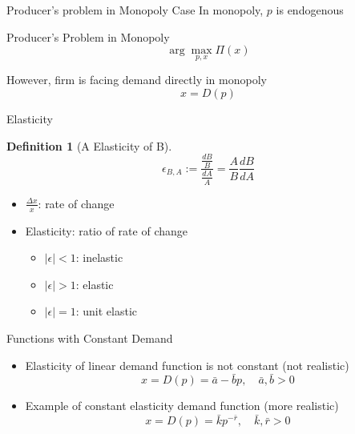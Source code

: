 \documentclass[final]{beamer}
\newtheorem{defn}{Definition}
\begin{document}
\begin{frame}[t]{Producer's problem in Monopoly Case}
	In monopoly, $p$ is endogenous
	\begin{block}
		{Producer's Problem in Monopoly}
		\[
			\arg\max_{p,x} \Pi(x)
		\]
	\end{block}
	However, firm is facing demand directly in monopoly
	\[
		x=D(p) \tag{Demand Function}
	\]
\end{frame}

\begin{frame}[t]{Elasticity}
	\begin{defn}
		[A Elasticity of B]
		\[
			\epsilon_{B,A} := \frac{\frac{d B}{B}}{\frac{d A}{A}} = \frac{A}{B}\frac{dB}{dA}
		\]
	\end{defn}
	\begin{itemize}
		\item $\frac{\Delta x}{x}$: rate of change
		\item Elasticity: ratio of rate of change
		\begin{itemize}
			\item $|\epsilon|<1$: inelastic
			\item $|\epsilon|>1$: elastic
			\item $|\epsilon|=1$: unit elastic
		\end{itemize}
	\end{itemize}
\end{frame}

\begin{frame}[t]{Functions with Constant Demand}
	\begin{itemize}
		\item Elasticity of linear demand function is not constant (not realistic)
		\[
			x=D(p)=\bar a - \bar b p,\quad \bar a,\bar b >0
		\]
		\item Example of constant elasticity demand function (more realistic)
		\[
			x=D(p)=\bar k p^{-\bar r},\quad \bar k, \bar r >0
		\]
	\end{itemize}
\end{frame}

\end{document}
